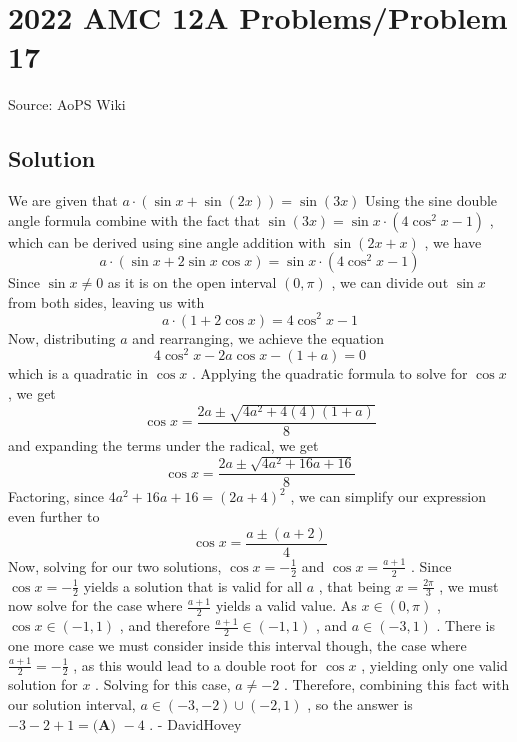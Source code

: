 \documentclass[12pt]{article}
\begin{document}
\section*{{2022 AMC 12A Problems/Problem 17}}
Source: AoPS Wiki

\subsection*{Solution}
We are given that $a\cdot(\sin{x}+\sin{(2x)})=\sin{(3x)}$ Using the sine double angle formula combine with the fact that $\sin{(3x)} = \sin{x}\cdot(4\cos^2{x}-1)$ , which can be derived using sine angle addition with $\sin{(2x + x)}$ , we have \[a\cdot(\sin{x}+2\sin{x}\cos{x})=\sin{x}\cdot(4\cos^2{x}-1)\] Since $\sin{x} \ne 0$ as it is on the open interval $(0, \pi)$ , we can divide out $\sin{x}$ from both sides, leaving us with \[a\cdot(1+2\cos{x})=4\cos^2{x}-1\] Now, distributing $a$ and rearranging, we achieve the equation \[4\cos^2{x} - 2a\cos{x} - (1+a) = 0\] which is a quadratic in $\cos{x}$ . Applying the quadratic formula to solve for $\cos{x}$ , we get \[\cos{x} =\frac{2a\pm\sqrt{4a^2+4(4)(1+a)}}{8}\] and expanding the terms under the radical, we get \[\cos{x} =\frac{2a\pm\sqrt{4a^2+16a+16}}{8}\] Factoring, since $4a^2+16a+16 = (2a+4)^2$ , we can simplify our expression even further to \[\cos{x} =\frac{a\pm(a+2)}{4}\] Now, solving for our two solutions, $\cos{x} = -\frac{1}{2}$ and $\cos{x} = \frac{a+1}{2}$ . Since $\cos{x} = -\frac{1}{2}$ yields a solution that is valid for all $a$ , that being $x = \frac{2\pi}{3}$ , we must now solve for the case where $\frac{a+1}{2}$ yields a valid value. As $x\in (0, \pi)$ , $\cos{x}\in (-1, 1)$ , and therefore $\frac{a+1}{2}\in (-1, 1)$ , and $a\in(-3,1)$ . There is one more case we must consider inside this interval though, the case where $\frac{a+1}{2} = -\frac{1}{2}$ , as this would lead to a double root for $\cos{x}$ , yielding only one valid solution for $x$ . Solving for this case, $a \ne -2$ . Therefore, combining this fact with our solution interval, $a\in(-3, -2) \cup (-2, 1)$ , so the answer is $-3-2+1 = \boxed{\textbf{(A) } {-}4}$ . - DavidHovey
\end{document}
